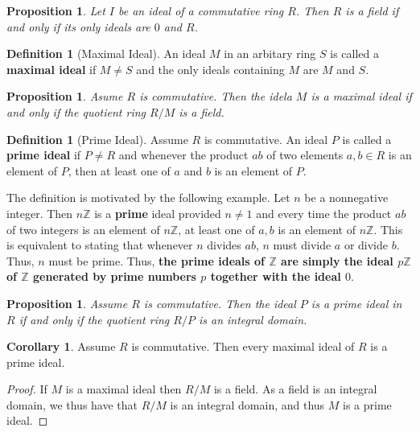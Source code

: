 \documentclass[10pt, oneside, reqno]{amsart}
\theoremstyle{plain}%
\newtheorem{prop}[thm]{Proposition}
\theoremstyle{definition}
\newtheorem{defn}[thm]{Definition}
\newtheorem{cor}[thm]{Corollary}
\theoremstyle{remark}
\newcommand{\Z}{\mathbb{Z}}
\begin{document}
\begin{prop}
	Let $I$ be an ideal of a commutative ring $R$.  Then $R$ is a field if and only if its only ideals are $0$ and $R$.
\end{prop}

\begin{defn}[Maximal Ideal]
	An ideal $M$ in an arbitary ring $S$ is called a \textbf{maximal ideal} if $M \neq S$ and the only ideals containing $M$ are $M$ and $S$.
\end{defn}

\begin{prop}
	Asume $R$ is commutative.  Then the idela $M$ is a maximal ideal if and only if the quotient ring $R/M$ is a field.
\end{prop}


\begin{defn}[Prime Ideal]
	Assume $R$ is commutative.  An ideal $P$ is called a \textbf{prime ideal} if $P \neq R$ and whenever the product $ab$ of two elements $a,b \in R$ is an element of $P$, then at least one of $a$ and $b$ is an element of $P$.  
	
	The definition is motivated by the following example.  Let $n$ be a nonnegative integer.  Then $n\Z$ is a \textbf{prime} ideal provided $n \neq 1$ and every time the product $ab$ of two integers is an element of $n\Z$, at least one of $a,b$ is an element of $n\Z$. This is equivalent to stating that whenever $n$ divides $ab$, $n$ must divide $a$ or divide $b$.  Thus, $n$ must be prime.  Thus, \textbf{the prime ideals of $\Z$ are simply the ideal $p\Z$ of $\Z$ generated by prime numbers $p$ together with the ideal $0$}.
\end{defn}

\begin{prop}
	Assume $R$ is commutative.  Then the ideal $P$ is a prime ideal in $R$ if and only if the quotient ring $R/P$ is an integral domain.
\end{prop}

\begin{cor}
	Assume $R$ is commutative.  Then every maximal ideal of $R$ is a prime ideal.
\end{cor}
\begin{proof}
	If $M$ is a maximal ideal then $R/M$ is a field.  As a field is an integral domain, we thus have that $R/M$ is an integral domain, and thus $M$ is a prime ideal.
\end{proof}


\end{document}
